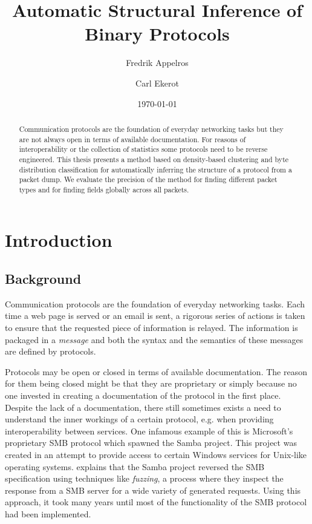 \documentclass[a4paper]{report}
\subtitle{}
\makeatletter
\newcommand{\company}[1]{\def \@company {#1}}
\newcommand{\supervisor}[1]{\def \@supervisor {#1}}
\newcommand{\examiner}[1]{\def \@examiner {#1}}
\newcommand\blankpage{%
    \null
    \thispagestyle{empty}%
    \addtocounter{page}{-1}%
    \newpage}
\makeatother
\begin{document}
\title{Automatic Structural Inference of Binary Protocols}
\author{Fredrik Appelros \and Carl Ekerot}
\company{Procera Networks}
\supervisor{Anders Waldenborg}
\examiner{Pierre Nugues}
\date{\today}
\maketitle
\blankpage

\begin{abstract}
Communication protocols are the foundation of everyday networking tasks but
they are not always open in terms of available documentation. For reasons of
interoperability or the collection of statistics some protocols need to be
reverse engineered. This thesis presents a method based on density-based
clustering and byte distribution classification for automatically inferring the
structure of a protocol from a packet dump. We evaluate the precision of the
method for finding different packet types and for finding fields globally
across all packets.
\end{abstract}
\blankpage

\tableofcontents

\chapter{Introduction}

\section{Background}
Communication protocols are the foundation of everyday networking tasks. Each
time a web page is served or an email is sent, a rigorous series of actions is
taken to ensure that the requested piece of information is relayed. The
information is packaged in a \emph{message} and both the syntax and the
semantics of these messages are defined by protocols.

Protocols may be open or closed in terms of available documentation. The reason
for them being closed might be that they are proprietary or simply because no
one invested in creating a documentation of the protocol in the first place.
Despite the lack of a documentation, there still sometimes exists a need to
understand the inner workings of a certain protocol, e.g. when providing
interoperability between services. One infamous example of this is Microsoft's
proprietary SMB protocol which spawned the Samba project. This project was
created in an attempt to provide access to certain Windows services for
Unix-like operating systems. \citet{tridgell03} explains that the Samba project
reversed the SMB specification using techniques like \emph{fuzzing}, a process
where they inspect the response from a SMB server for a wide variety of
generated requests. Using this approach, it took many years until most of the
functionality of the SMB protocol had been implemented.
\end{document}
